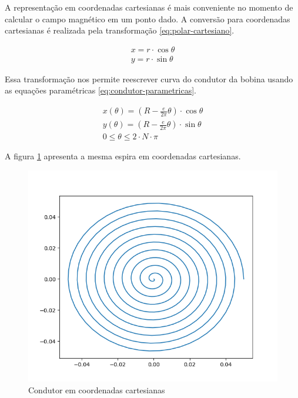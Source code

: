 \documentclass[
	article,			%
	11pt,				%
	oneside,			%
	a4paper,			%
	english,			%
	brazil,				%
	sumario=tradicional
	]{abntex2}
\begin{document}
A representação em coordenadas cartesianas é mais conveniente no momento de calcular o campo magnético em um ponto dado. A conversão para coordenadas cartesianas é realizada pela transformação \ref{eq:polar-cartesiano}.

\begin{equation} \label{eq:polar-cartesiano}
	\begin{array}{l}
	x = r \cdot \cos \theta \\ 
	y = r \cdot \sin \theta
	\end{array}
\end{equation}

Essa transformação nos permite reescrever curva do condutor da bobina usando as equações paramétricas \ref{eq:condutor-parametricas}.

\begin{equation} \label{eq:condutor-parametricas}
	\begin{array}{l}
		x(\theta) = \left(  R - \frac{e}{2\pi} \theta \right) \cdot \cos \theta \\
		y(\theta) = \left(  R - \frac{e}{2\pi} \theta \right) \cdot \sin \theta \\
		0 \le \theta \le 2\cdot N \cdot \pi
	\end{array}
\end{equation}

A figura \ref{fig:espiracartesiana} apresenta a mesma espira em coordenadas cartesianas.

\begin{figure}[h]
	\centering
	\includegraphics[width=0.7\linewidth]{figures/espiracartesiana}
	\caption[Condutor em coordenadas cartesianas]{Condutor em coordenadas cartesianas}
	\label{fig:espiracartesiana}
\end{figure}
\end{document}

